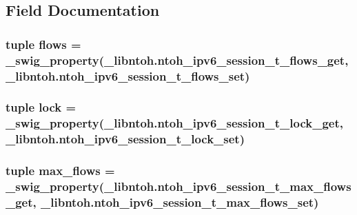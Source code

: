 \subsection{Field Documentation}
\hypertarget{classlibntoh_1_1ntoh__ipv6__session__t_afca3cb4196e6410df799227741f11b5e}{
\subsubsection[{flows}]{\setlength{\rightskip}{0pt plus 5cm}tuple flows = {\bf \-\_\-swig\-\_\-property}(\-\_\-libntoh.\-ntoh\-\_\-ipv6\-\_\-session\-\_\-t\-\_\-flows\-\_\-get, \-\_\-libntoh.\-ntoh\-\_\-ipv6\-\_\-session\-\_\-t\-\_\-flows\-\_\-set)\hspace{0.3cm}{\ttfamily [static]}}}\label{classlibntoh_1_1ntoh__ipv6__session__t_afca3cb4196e6410df799227741f11b5e}
\hypertarget{classlibntoh_1_1ntoh__ipv6__session__t_a871c7bf899334194698c2a3bced5e064}{
\subsubsection[{lock}]{\setlength{\rightskip}{0pt plus 5cm}tuple lock = {\bf \-\_\-swig\-\_\-property}(\-\_\-libntoh.\-ntoh\-\_\-ipv6\-\_\-session\-\_\-t\-\_\-lock\-\_\-get, \-\_\-libntoh.\-ntoh\-\_\-ipv6\-\_\-session\-\_\-t\-\_\-lock\-\_\-set)\hspace{0.3cm}{\ttfamily [static]}}}\label{classlibntoh_1_1ntoh__ipv6__session__t_a871c7bf899334194698c2a3bced5e064}
\hypertarget{classlibntoh_1_1ntoh__ipv6__session__t_af05028fd588ff1bc962a8a89057a3716}{
\subsubsection[{max\-\_\-flows}]{\setlength{\rightskip}{0pt plus 5cm}tuple max\-\_\-flows = {\bf \-\_\-swig\-\_\-property}(\-\_\-libntoh.\-ntoh\-\_\-ipv6\-\_\-session\-\_\-t\-\_\-max\-\_\-flows\-\_\-get, \-\_\-libntoh.\-ntoh\-\_\-ipv6\-\_\-session\-\_\-t\-\_\-max\-\_\-flows\-\_\-set)\hspace{0.3cm}{\ttfamily [static]}}}\label{classlibntoh_1_1ntoh__ipv6__session__t_af05028fd588ff1bc962a8a89057a3716}
